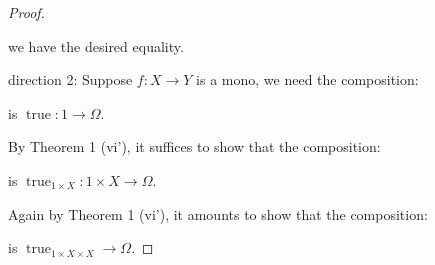 \documentclass[a4paper]{article}
\DeclareMathOperator{\ev}{\text {ev}}
\DeclareMathOperator{\true}{\text {true}}
\begin{document}
\begin{proof}
    \begin{center}
    \end{center}

    we have the desired equality.

    direction 2: Suppose $f:X\to Y$ is a mono, we need the composition:

    \begin{center}
    \end{center}
    is $\true:1\to \Omega$.

    By Theorem 1 (vi'), it suffices to show that the composition:

    \begin{center}
    \end{center}

    is $\true_{1\times X}: 1\times X\to\Omega$.

    Again by Theorem 1 (vi'), it amounts to show that the composition:

    \begin{center}
    \end{center}

    is $\true_{1\times X\times X}\to\Omega$.


\end{proof}
\end{document}
